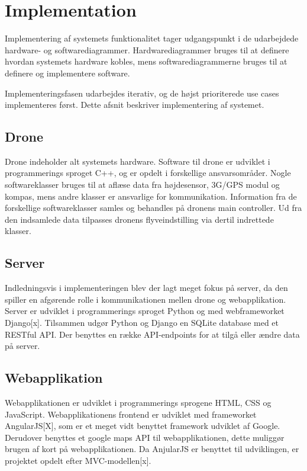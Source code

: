 \chapter{Implementation}
Implementering af systemets funktionalitet tager udgangspunkt i de udarbejdede hardware- og softwarediagrammer. Hardwarediagrammer bruges til at definere hvordan systemets hardware kobles, mens softwarediagrammerne bruges til at definere og implementere software.

Implementeringsfasen udarbejdes iterativ, og de højst prioriterede use cases implementeres først. 
Dette afsnit beskriver implementering af systemet.


\section{Drone}
Drone indeholder alt systemets hardware. Software til drone er udviklet i programmerings sproget C++, og er opdelt i forskellige ansvarsområder. Nogle softwareklasser bruges til at aflæse data fra højdesensor, 3G/GPS modul og kompas, mens andre klasser er ansvarlige for kommunikation. Information fra de forskellige softwareklasser samles og behandles på dronens main controller. Ud fra den indsamlede data tilpasses dronens flyveindstilling via dertil indrettede klasser. 


\section{Server}
Indledningsvis i implementeringen blev der lagt meget fokus på server, da den spiller en afgørende rolle i kommunikationen mellen drone og webapplikation. 
Server er udviklet i programmerings sproget Python og med webframeworket Django[x].
Tilsammen udgør Python og Django en SQLite database med et RESTful API. Der benyttes en række API-endpoints for at tilgå eller ændre data på server.

\section{Webapplikation}
Webapplikationen  er udviklet i programmerings sprogene HTML, CSS og JavaScript. Webapplikationens frontend er udviklet med frameworket AngularJS[X], som er et meget vidt benyttet framework udviklet af Google. Derudover benyttes et google maps API til webapplikationen, dette muliggør brugen af kort på webapplikationen. Da AnjularJS er benyttet til udviklingen, er projektet opdelt efter MVC-modellen[x]. 


